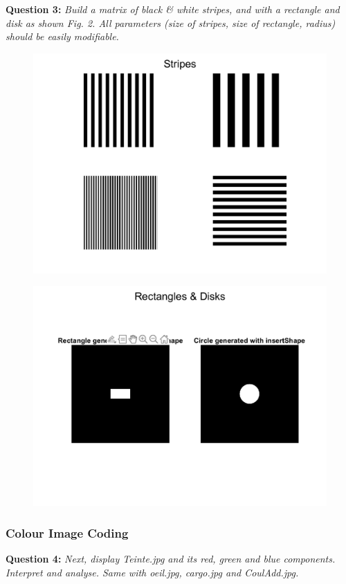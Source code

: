 \textbf{Question 3:}
\textit{Build a matrix of black \& white stripes, and with a rectangle and disk as shown Fig. 2. All parameters (size of stripes, size of rectangle, radius) should be easily modiﬁable.}

\begin{figure}[H]
    \centering
    \includegraphics[width=0.75\linewidth]{Doc/Graphics/Part1/Part1_Question3a.png}
    \label{fig:enter-label}
\end{figure}

\begin{figure}[H]
    \centering
    \includegraphics[width=0.5\linewidth]{Doc/Graphics/Part1/Part1_Question3b.png}
    \label{fig:enter-label}
\end{figure}



\subsubsection{Colour Image Coding}
\textbf{Question 4:}
\textit{Next, display Teinte.jpg and its red, green and blue components. Interpret and analyse. Same with oeil.jpg, cargo.jpg and CoulAdd.jpg.}

